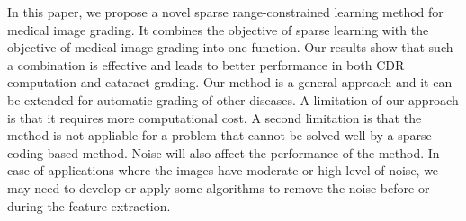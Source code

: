 \documentclass[journal]{IEEEtran}
\begin{document}
In this paper, we propose a novel sparse range-constrained
learning method for medical image grading. It combines the
objective of sparse learning with the objective of medical
image grading into one function. Our results show that such
a combination is effective and leads to better performance
in both CDR computation and cataract grading. Our method
is a general approach and it can be extended for automatic
grading of other diseases. A limitation of our approach is that
it requires more computational cost. A second limitation is
that the method is not appliable for a problem that cannot be
solved well by a sparse coding based method. Noise will also
affect the performance of the method. In case of applications
where the images have moderate or high level of noise, we
may need to develop or apply some algorithms to remove the
noise before or during the feature extraction.





\end{document}

